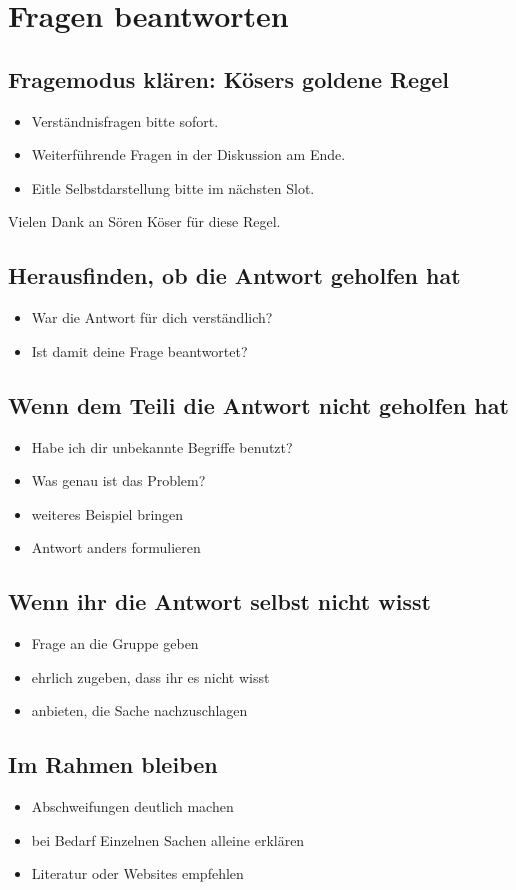\section{Fragen beantworten}

\subsection{Fragemodus klären: Kösers goldene Regel}
\begin{itemize}
  \item Verständnisfragen bitte sofort.
  \item Weiterführende Fragen in der Diskussion am Ende.
  \item Eitle Selbstdarstellung bitte im nächsten Slot.
\end{itemize}

Vielen Dank an Sören Köser für diese Regel.


\subsection{Herausfinden, ob die Antwort geholfen hat}
\begin{itemize}
  \item War die Antwort für dich verständlich?
  \item Ist damit deine Frage beantwortet?
\end{itemize}

\subsection{Wenn dem Teili die Antwort nicht geholfen hat}
\begin{itemize}
  \item Habe ich dir unbekannte Begriffe benutzt?
  \item Was genau ist das Problem?
  \item weiteres Beispiel bringen
  \item Antwort anders formulieren
\end{itemize}

\subsection{Wenn ihr die Antwort selbst nicht wisst}
\begin{itemize}
  \item Frage an die Gruppe geben
  \item ehrlich zugeben, dass ihr es nicht wisst
  \item anbieten, die Sache nachzuschlagen
\end{itemize}

\subsection{Im Rahmen bleiben}
\begin{itemize}
  \item Abschweifungen deutlich machen
  \item bei Bedarf Einzelnen Sachen alleine erklären
  \item Literatur oder Websites empfehlen
\end{itemize}
